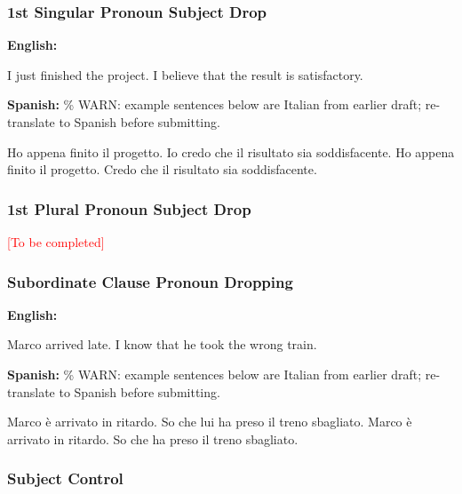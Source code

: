\documentclass[12pt]{article}
\begin{document}
\subsubsection{1st Singular Pronoun Subject Drop}

\begin{exe}
    \ex \textbf{English:}
    \begin{xlist}
        \ex I just finished the project. I believe that the result is satisfactory.
    \end{xlist}
    \ex \textbf{Spanish:} \% WARN: example sentences below are Italian from earlier draft; re-translate to Spanish before submitting.
    \begin{xlist}
        \ex Ho appena finito il progetto. Io credo che il risultato sia soddisfacente.
        \ex Ho appena finito il progetto. Credo che il risultato sia soddisfacente.
    \end{xlist}
\end{exe}

\subsubsection{1st Plural Pronoun Subject Drop}

\textcolor{red}{[To be completed]}

\subsubsection{Subordinate Clause Pronoun Dropping}

\begin{exe}
    \ex \textbf{English:}
    \begin{xlist}
        \ex Marco arrived late. I know that he took the wrong train.
    \end{xlist}
    \ex \textbf{Spanish:} \% WARN: example sentences below are Italian from earlier draft; re-translate to Spanish before submitting.
    \begin{xlist}
        \ex Marco \`e arrivato in ritardo. So che lui ha preso il treno sbagliato.
        \ex Marco \`e arrivato in ritardo. So che ha preso il treno sbagliato.
    \end{xlist}
\end{exe}

\subsubsection{Subject Control}
\end{document}
